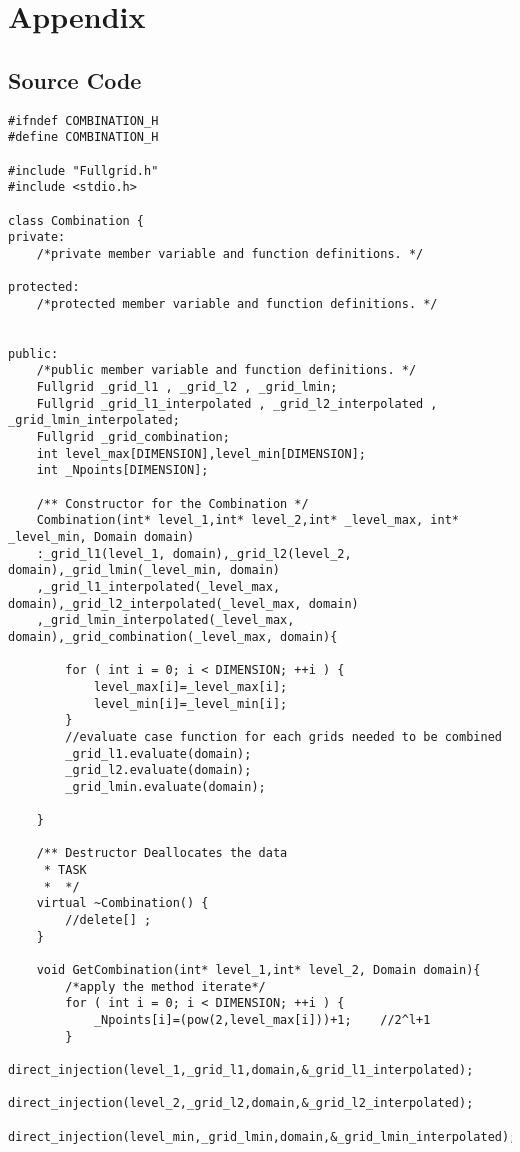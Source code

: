 \chapter{Appendix}
\label{chapter:DetailedDescriptions}

\section{Source Code}
 \lstset{language=C++}
\begin{lstlisting}[caption= Source code for adaptive combination technique, label=code:combi]
#ifndef COMBINATION_H
#define COMBINATION_H

#include "Fullgrid.h"
#include <stdio.h>

class Combination {
private:
	/*private member variable and function definitions. */

protected:
	/*protected member variable and function definitions. */


public:
	/*public member variable and function definitions. */
	Fullgrid _grid_l1 , _grid_l2 , _grid_lmin;
	Fullgrid _grid_l1_interpolated , _grid_l2_interpolated , _grid_lmin_interpolated;
	Fullgrid _grid_combination;
	int level_max[DIMENSION],level_min[DIMENSION];
	int _Npoints[DIMENSION];

	/** Constructor for the Combination */
	Combination(int* level_1,int* level_2,int* _level_max, int* _level_min, Domain domain)
	:_grid_l1(level_1, domain),_grid_l2(level_2, domain),_grid_lmin(_level_min, domain)
	,_grid_l1_interpolated(_level_max, domain),_grid_l2_interpolated(_level_max, domain)
	,_grid_lmin_interpolated(_level_max, domain),_grid_combination(_level_max, domain){

		for ( int i = 0; i < DIMENSION; ++i ) {
			level_max[i]=_level_max[i];
			level_min[i]=_level_min[i];
		}
		//evaluate case function for each grids needed to be combined
		_grid_l1.evaluate(domain);
		_grid_l2.evaluate(domain);
		_grid_lmin.evaluate(domain);

	}

	/** Destructor Deallocates the data
	 * TASK
	 *  */
	virtual ~Combination() {
		//delete[] ;
	}

	void GetCombination(int* level_1,int* level_2, Domain domain){
		/*apply the method iterate*/
		for ( int i = 0; i < DIMENSION; ++i ) {
			_Npoints[i]=(pow(2,level_max[i]))+1;	//2^l+1
		}
		direct_injection(level_1,_grid_l1,domain,&_grid_l1_interpolated);
		direct_injection(level_2,_grid_l2,domain,&_grid_l2_interpolated);
		direct_injection(level_min,_grid_lmin,domain,&_grid_lmin_interpolated);


\end{lstlisting}
